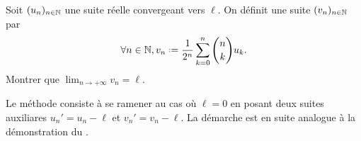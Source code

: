 \begin{exercice}
    Soit $(u_n)_{n \in \mathbb{N}}$ une suite réelle convergeant vers $\ell$. On définit une suite $(v_n)_{n \in \mathbb{N}}$ par 
    $$\forall n \in \N, v_n \defeq \frac{1}{2^n} \sum_{k=0}^{n} \binom{n}{k} u_k.$$
    Montrer que $\displaystyle \lim_{n \rightarrow + \infty} v_n = \ell$.
\end{exercice}

\begin{elem_sol}
    Le méthode consiste à se ramener au cas où $\ell = 0$ en posant deux suites auxiliares $u_n'=u_n - \ell$ et $v_n' = v_n - \ell$. La démarche est en suite analogue à la démonstration du .
\end{elem_sol}

